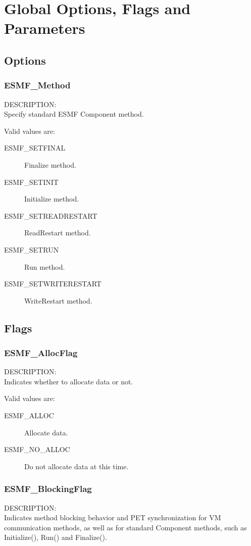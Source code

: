 
\section{Global Options, Flags and Parameters}

\subsection{Options}

\subsubsection{ESMF\_Method}
\label{opt:method}
{\sf DESCRIPTION:\\}  
Specify standard ESMF Component method.

Valid values are:
\begin{description}
\item [ESMF\_SETFINAL]
      Finalize method.
\item [ESMF\_SETINIT]
      Initialize method.
\item [ESMF\_SETREADRESTART]
      ReadRestart method.
\item [ESMF\_SETRUN]
      Run method.
\item [ESMF\_SETWRITERESTART]
      WriteRestart method.
\end{description}


\subsection{Flags}

\subsubsection{ESMF\_AllocFlag}
\label{opt:allocflag}
{\sf DESCRIPTION:\\}  
Indicates whether to allocate data or not.

Valid values are:
\begin{description}
\item [ESMF\_ALLOC]
      Allocate data. 
\item [ESMF\_NO\_ALLOC]
      Do not allocate data at this time. 
\end{description}

\subsubsection{ESMF\_BlockingFlag}
\label{opt:blockingflag}
{\sf DESCRIPTION:\\}  
Indicates method blocking behavior and PET synchronization for VM communication
methods, as well as for standard Component methods, such as Initialize(), Run() 
and Finalize().

